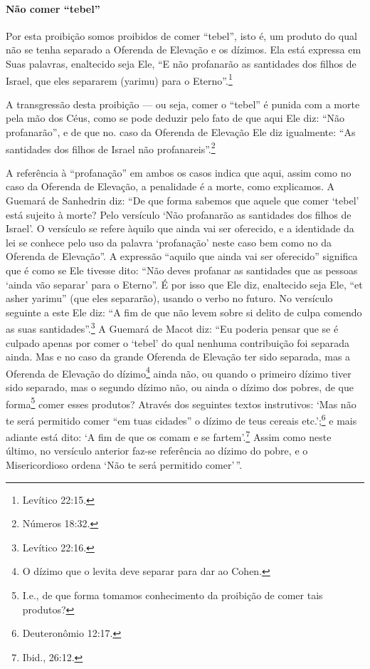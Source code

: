 \paragraph{Não comer ``tebel''}

Por esta proibição somos proibidos de comer ``tebel'', isto é, um
produto do qual não se tenha separado a Oferenda de Elevação e os
dízimos. Ela está expressa em Suas palavras, enaltecido seja Ele, ``E
não profanarão as santidades dos filhos de Israel, que eles separarem
(yarimu) para o Eterno''.\footnote{Levítico 22:15.}

A transgressão desta proibição --- ou seja, comer o ``tebel'' é punida
com a morte pela mão dos Céus, como se pode deduzir pelo fato de que
aqui Ele diz: ``Não profanarão'', e de que no. caso da Oferenda de
Elevação Ele diz igualmente: ``As santidades dos filhos de Israel não
profanareis''.\footnote{Números 18:32.}

A referência à ``profanação'' em ambos os casos indica que aqui, assim
como no caso da Oferenda de Elevação, a penalidade é a morte, como
explicamos.
A Guemará de Sanhedrin diz: ``De que forma sabemos que aquele
que comer `tebel' está sujeito à morte? Pelo versículo `Não profanarão
as santidades dos filhos de Israel'. O versículo se refere àquilo que
ainda vai ser oferecido, e a identidade da lei se conhece pelo uso da
palavra `profanação' neste caso bem como no da Oferenda de Elevação''. A
expressão ``aquilo que ainda vai ser oferecido'' significa que é como se
Ele tivesse dito: ``Não deves profanar as santidades que as pessoas
`ainda vão separar' para o Eterno''. É por isso que Ele diz, enaltecido
seja Ele, ``et asher yarimu'' (que eles separarão), usando o verbo no
futuro. No versículo seguinte a este Ele diz: ``A fim de que não levem
sobre si delito de culpa comendo as suas santidades''.\footnote{Levítico 22:16.}
A Guemará de Macot diz: ``Eu poderia pensar que se é culpado apenas por
comer o `tebel' do qual nenhuma contribuição foi separada ainda. Mas
e no caso da grande Oferenda de Elevação ter sido separada, mas a
Oferenda de Elevação do dízimo\footnote{O dízimo que o levita deve separar para dar ao Cohen.} ainda não, ou quando o
primeiro dízimo tiver sido separado, mas o segundo dízimo não, ou ainda
o dízimo dos pobres, de que forma\footnote{I.e., de que forma tomamos conhecimento da proibição de comer tais
  produtos?} comer esses
produtos? Através dos seguintes textos instrutivos: `Mas não te será
permitido comer ``em tuas cidades'' o dízimo de teus cereais etc.';\footnote{Deuteronômio 12:17.} e mais adiante está dito: `A fim de que os comam e
se fartem'.\footnote{Ibid., 26:12.} Assim como neste último, no versículo
anterior faz-se referência ao dízimo do pobre, e o Misericordioso ordena
`Não te será permitido comer'\,''.

